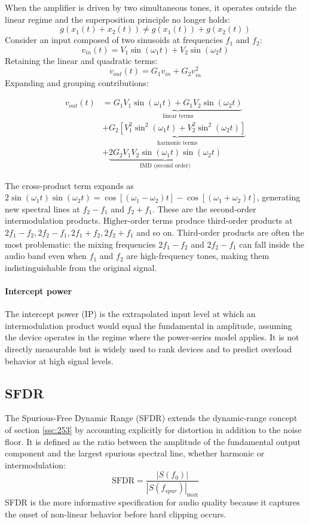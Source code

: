 When the amplifier is driven by two simultaneous tones, it operates outside the linear regime and the superposition principle no longer holds:
\[
g\left(x_1(t) + x_2(t)\right) \neq g\left(x_1(t)\right) + g\left(x_2(t)\right)
\]
Consider an input composed of two sinusoids at frequencies \( f_1 \) and \( f_2 \):
\[
v_{in}(t) = V_1\sin(\omega_1 t) + V_2\sin(\omega_2 t)
\]
Retaining the linear and quadratic terms:
\[
v_{out}(t) = G_1 v_{in} + G_2 v_{in}^2
\]
Expanding and grouping contributions:

\begin{align*}
v_{out}(t) &= \underbrace{G_1 V_1\sin(\omega_1 t) + G_1 V_2\sin(\omega_2 t)}_{\text{linear terms}}\\
&+ \underbrace{G_2\left[V_1^2\sin^2(\omega_1 t) + V_2^2\sin^2(\omega_2 t)\right]}_{\text{harmonic terms}}\\
&+ \underbrace{2G_2 V_1 V_2\sin(\omega_1 t)\sin(\omega_2 t)}_{\text{IMD (second order)}}
\end{align*}

The cross-product term expands as \( 2\sin(\omega_1 t)\sin(\omega_2 t) = \cos\left[(\omega_1-\omega_2)t\right] - \cos\left[(\omega_1+\omega_2)t\right] \), generating new spectral lines at \( f_2 - f_1 \) and \( f_2 + f_1 \). These are the second-order intermodulation products. Higher-order terms produce third-order products at \( 2f_1 - f_2, 2f_2 - f_1, 2f_1 + f_2, 2f_2 + f_1 \) and so on. Third-order products are often the most problematic: the mixing frequencies \( 2f_1 - f_2 \) and \( 2f_2 - f_1 \) can fall inside the audio band even when \( f_1 \) and \( f_2 \) are high-frequency tones, making them indistinguishable from the original signal.

\paragraph{Intercept power} The intercept power (IP) is the extrapolated input level at which an intermodulation product would equal the fundamental in amplitude, assuming the device operates in the regime where the power-series model applies. It is not directly measurable but is widely used to rank devices and to predict overload behavior at high signal levels.

\subsection{SFDR}

The Spurious-Free Dynamic Range (SFDR) extends the dynamic-range concept of section \ref{ssc:253} by accounting explicitly for distortion in addition to the noise floor. It is defined as the ratio between the amplitude of the fundamental output component and the largest spurious spectral line, whether harmonic or intermodulation:
\[
\mathrm{SFDR} = \frac{|S(f_0)|}{|S(f_{spur})|_{\max}}
\]
SFDR is the more informative specification for audio quality because it captures the onset of non-linear behavior before hard clipping occurs.

